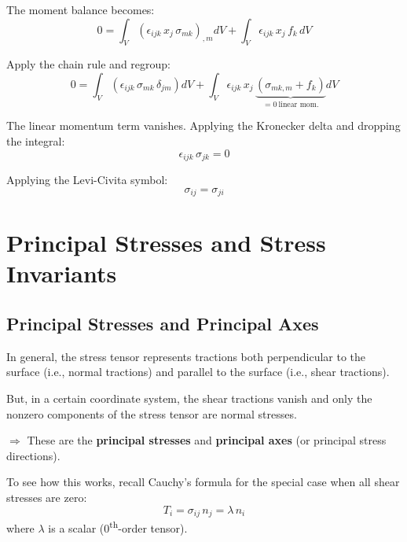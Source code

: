 \documentclass[11pt]{article}
\begin{document}
\noindent The moment balance becomes:
\begin{equation}
  0 = \int_V \left(\epsilon_{ijk}\, x_j\, \sigma_{mk}\right)_{,m} dV
    + \int_V \epsilon_{ijk}\, x_j\, f_k\, dV
\end{equation}

Apply the chain rule and regroup:
\begin{equation}
  0 = \int_V \left(\epsilon_{ijk}\, \sigma_{mk}\, \delta_{jm}\right) dV
    + \int_V \epsilon_{ijk}\, x_j\, \underbrace{\left(\sigma_{mk,m} + f_k\right)}_{= 0\ \text{linear mom.}} dV
\end{equation}

The linear momentum term vanishes.  Applying the Kronecker delta and dropping the integral:
\begin{equation}
  \epsilon_{ijk}\, \sigma_{jk} = 0
\end{equation}

Applying the Levi-Civita symbol:
\begin{equation}
  \boxed{\sigma_{ij} = \sigma_{ji}} 
\end{equation}

\section{Principal Stresses and Stress Invariants}

\subsection{Principal Stresses and Principal Axes}

In general, the stress tensor represents tractions both perpendicular to the surface (i.e., normal tractions) and parallel to the surface (i.e., shear tractions).

But, in a certain coordinate system, the shear tractions vanish and only the nonzero components of the stress tensor are normal stresses.

$\Rightarrow$ These are the \textbf{principal stresses} and \textbf{principal axes} (or principal stress directions).

To see how this works, recall Cauchy's formula for the special case when all shear stresses are zero:
\begin{equation}
  T_i = \sigma_{ij}\, n_j = \lambda\, n_i
\end{equation}
where $\lambda$ is a scalar (0\textsuperscript{th}-order tensor).
\end{document}
